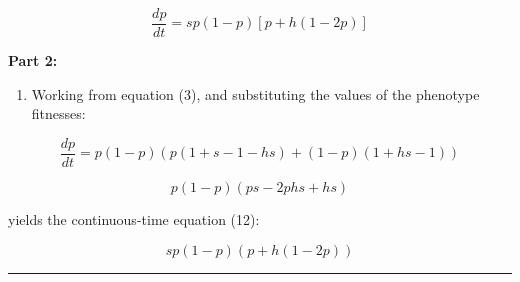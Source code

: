 \begin{equation} \frac{dp}{dt} = sp(1-p)[p + h(1-2p)] \end{equation}

\textbf{Part 2:}

\begin{enumerate}
\def\labelenumi{\arabic{enumi}.}
\setcounter{enumi}{5}
\tightlist
\item
  Working from equation (3), and substituting the values of the
  phenotype fitnesses:
\end{enumerate}

\begin{equation} \frac{dp}{dt} = p(1-p)(p(1+s - 1-hs) + (1-p)(1+hs-1)) \end{equation}

\begin{equation} p(1-p)(ps - 2phs + hs) \end{equation}

yields the continuous-time equation (12):

\begin{equation} sp(1-p)(p + h(1-2p)) \end{equation}

\begin{center}\rule{0.5\linewidth}{\linethickness}\end{center}
